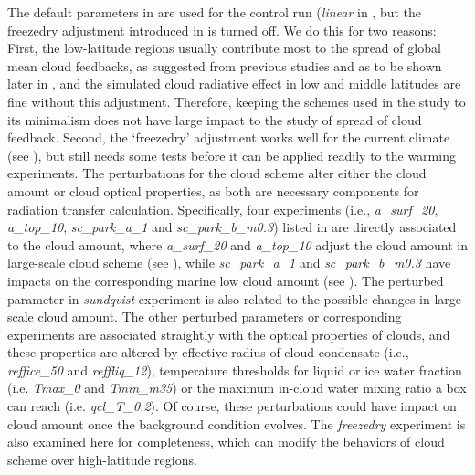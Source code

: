 The default parameters in  are used for the control run (\textit{linear} in , but the freezedry adjustment introduced in  is turned off. We do this for two reasons: First, the low-latitude regions usually contribute most to the spread of global mean cloud feedbacks, as suggested from previous studies and as to be shown later in , and the simulated cloud radiative effect in low and middle latitudes are fine without this adjustment. Therefore, keeping the schemes used in the study to its minimalism does not have large impact to the study of spread of cloud feedback. Second, the `freezedry' adjustment works well for the current climate (see ), but still needs some tests before it can be applied readily to the warming experiments. The perturbations for the cloud scheme alter either the cloud amount or cloud optical properties, as both are necessary components for radiation transfer calculation. Specifically, four experiments (i.e., \textit{a\_surf\_20}, \textit{a\_top\_10}, \textit{sc\_park\_a\_1} and \textit{sc\_park\_b\_m0.3}) listed in  are directly associated to the cloud amount, where \textit{a\_surf\_20} and \textit{a\_top\_10} adjust the cloud amount in large-scale cloud scheme (see ), while \textit{sc\_park\_a\_1} and \textit{sc\_park\_b\_m0.3} have impacts on the corresponding marine low cloud amount (see ). The perturbed parameter in \textit{sundqvist} experiment is also related to the possible changes in large-scale cloud amount. The other perturbed parameters or corresponding experiments are associated straightly with the optical properties of clouds, and these properties are altered by effective radius of cloud condensate (i.e., \textit{reffice\_50} and \textit{reffliq\_12}), temperature thresholds for liquid or ice water fraction (i.e. \textit{Tmax\_0} and \textit{Tmin\_m35}) or the maximum in-cloud water mixing ratio a box can reach (i.e. \textit{qcl\_T\_0.2}). Of course, these perturbations could have impact on cloud amount once the background condition evolves. The \textit{freezedry} experiment is also examined here for completeness, which can modify the behaviors of cloud scheme over high-latitude regions.

